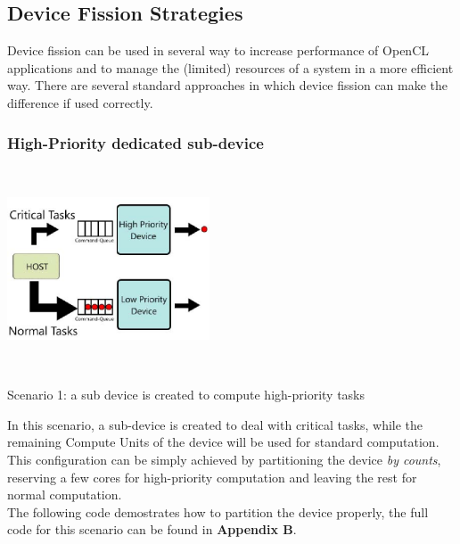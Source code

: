 \subsection{Device Fission Strategies}
Device fission can be used in several way to increase performance of OpenCL applications and to manage the (limited) resources of a system in a more efficient way. There are several standard approaches in which device fission can make the difference if used correctly.

\subsubsection{High-Priority dedicated sub-device}
\begin{figurehere}
 \centering
 \includegraphics[width=6cm, height=6cm]{./eps/HighPriority.eps}
 \caption{Scenario 1: a sub device is created to compute high-priority tasks}
 \label{fig:highPriority}
\end{figurehere}

In this scenario, a sub-device is created to deal with critical tasks, while the remaining Compute Units of the device will be used for standard computation.
This configuration can be simply achieved by partitioning the device \textit{by counts}, reserving a few cores for high-priority computation and leaving the rest for normal computation.\\
The following code demostrates how to partition the device properly, the full code for this scenario can be found in \textbf{Appendix B}.


